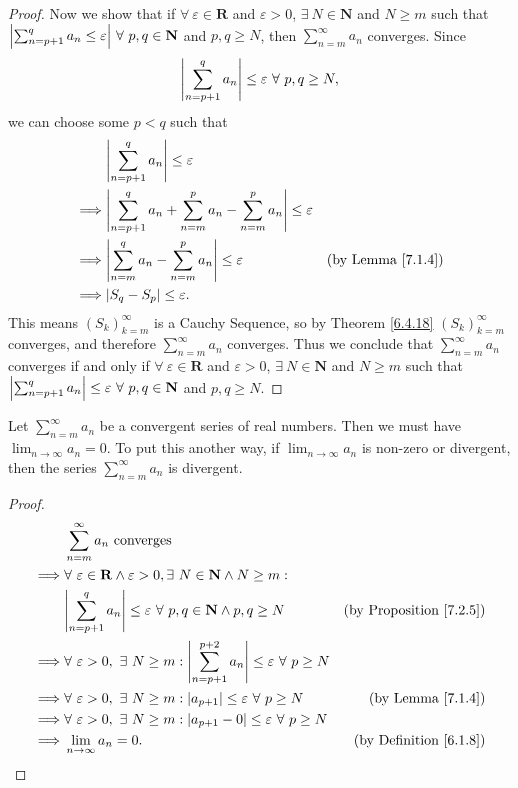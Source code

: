 \begin{proof}
Now we show that if \(\forall\ \varepsilon \in \mathbf{R}\) and \(\varepsilon > 0\), \(\exists\ N \in \mathbf{N}\) and \(N \geq m\) such that \(\abs*{\sum_{n = p + 1}^q a_n \leq \varepsilon} \ \forall\ p, q \in \mathbf{N}\) and \(p, q \geq N\), then \(\sum_{n = m}^\infty a_n\) converges.
Since
\[
    \abs*{\sum_{n = p + 1}^q a_n} \leq \varepsilon \ \forall\ p, q \geq N,
\]
we can choose some \(p < q\) such that
\begin{align*}
& \abs*{\sum_{n = p + 1}^q a_n} \leq \varepsilon \\
\implies & \abs*{\sum_{n = p + 1}^q a_n + \sum_{n = m}^p a_n - \sum_{n = m}^p a_n} \leq \varepsilon \\
\implies & \abs*{\sum_{n = m}^q a_n - \sum_{n = m}^p a_n} \leq \varepsilon & \text{(by Lemma \ref{7.1.4})} \\
\implies & \abs*{S_q - S_p} \leq \varepsilon.
\end{align*}
This means \((S_k)_{k = m}^\infty\) is a Cauchy Sequence, so by Theorem \ref{6.4.18} \((S_k)_{k = m}^\infty\) converges, and therefore \(\sum_{n = m}^\infty a_n\) converges.
Thus we conclude that \(\sum_{n = m}^\infty a_n\) converges if and only if \(\forall\ \varepsilon \in \mathbf{R}\) and \(\varepsilon > 0\), \(\exists\ N \in \mathbf{N}\) and \(N \geq m\) such that \(\abs*{\sum_{n = p + 1}^q a_n} \leq \varepsilon \ \forall\ p, q \in \mathbf{N}\) and \(p, q \geq N\).
\end{proof}

\begin{corollary}\label{7.2.6}
Let \(\sum_{n = m}^\infty a_n\) be a convergent series of real numbers.
Then we must have \(\lim_{n \to \infty} a_n = 0\).
To put this another way, if \(\lim_{n \to \infty} a_n\) is non-zero or divergent, then the series \(\sum_{n = m}^\infty a_n\) is divergent.
\end{corollary}

\begin{proof}
\begin{align*}
& \sum_{n = m}^\infty a_n \text{ converges} \\
\implies & \forall\ \varepsilon \in \mathbf{R} \land \varepsilon > 0, \exists\ N \in \mathbf{N} \land N \geq m : \\
& \abs*{\sum_{n = p + 1}^q a_n} \leq \varepsilon \ \forall\ p, q \in \mathbf{N} \land p, q \geq N & \text{(by Proposition \ref{7.2.5})} \\
\implies & \forall\ \varepsilon > 0, \ \exists\ N \geq m : \abs*{\sum_{n = p + 1}^{p + 2} a_n} \leq \varepsilon \ \forall\ p \geq N \\
\implies & \forall\ \varepsilon > 0, \ \exists\ N \geq m : \abs*{a_{p + 1}} \leq \varepsilon \ \forall\ p \geq N & \text{(by Lemma \ref{7.1.4})} \\
\implies & \forall\ \varepsilon > 0, \ \exists\ N \geq m : \abs*{a_{p + 1} - 0} \leq \varepsilon \ \forall\ p \geq N \\
\implies & \lim_{n \to \infty} a_n = 0. & \text{(by Definition \ref{6.1.8})}
\end{align*}
\end{proof}
